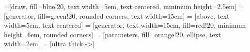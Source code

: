 
% 


=[draw, fill=blue!20, text width=5em, 
    text centered, minimum height=2.5em]
=[generator, fill=green!20, rounded corners, text width=15em]
 = [above, text width=5em, text centered]
 = [generator, text width=15em, fill=red!20, 
    minimum height=6em, rounded corners]
 = [parameters, fill=orange!20, ellipse, text width=2em]
 = [ultra thick,->]

\def\blockdist{2.3}
\def\edgedist{2.5}

